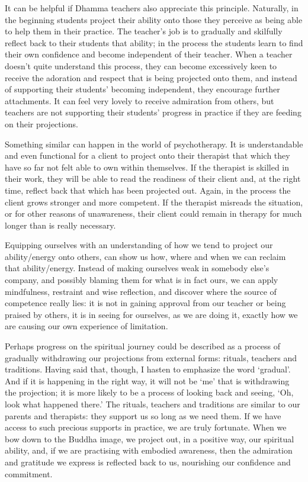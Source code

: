 It can be helpful if Dhamma teachers also appreciate this
principle. Naturally, in the beginning students project their ability
onto those they perceive as being able to help them in their practice.
The teacher's job is to gradually and skilfully reflect back to their
students that ability; in the process the students learn to find their
own confidence and become independent of their teacher. When a teacher
doesn't quite understand this process, they can become excessively keen
to receive the adoration and respect that is being projected onto them,
and instead of supporting their students' becoming independent, they
encourage further attachments. It can feel very lovely to receive
admiration from others, but teachers are not supporting their students'
progress in practice if they are feeding on their projections.

Something similar can happen in the world of psychotherapy. It is
understandable and even functional for a client to project onto their
therapist that which they have so far not felt able to own within
themselves. If the therapist is skilled in their work, they will be able
to read the readiness of their client and, at the right time, reflect
back that which has been projected out. Again, in the process the client
grows stronger and more competent. If the therapist misreads the
situation, or for other reasons of unawareness, their client could
remain in therapy for much longer than is really necessary.

Equipping ourselves with an understanding of how we tend to project our
ability/energy onto others, can show us how, where and when we can
reclaim that ability/energy. Instead of making ourselves weak in
somebody else's company, and possibly blaming them for what is in fact
ours, we can apply mindfulness, restraint and wise reflection, and
discover where the source of competence really lies: it is not in
gaining approval from our teacher or being praised by others, it is in
seeing for ourselves, as we are doing it, exactly how we are causing our
own experience of limitation.

Perhaps progress on the spiritual journey could be described as a
process of gradually withdrawing our projections from external forms:
rituals, teachers and traditions. Having said that, though, I hasten to
emphasize the word `gradual'. And if it is happening in the right way,
it will not be `me' that is withdrawing the projection; it is more
likely to be a process of looking back and seeing, `Oh, look what
happened there.' The rituals, teachers and traditions are similar to our
parents and therapists: they support us so long as we need them. If we
have access to such precious supports in practice, we are truly
fortunate. When we bow down to the Buddha image, we project out, in a
positive way, our spiritual ability, and, if we are practising with
embodied awareness, then the admiration and gratitude we express is
reflected back to us, nourishing our confidence and commitment.

